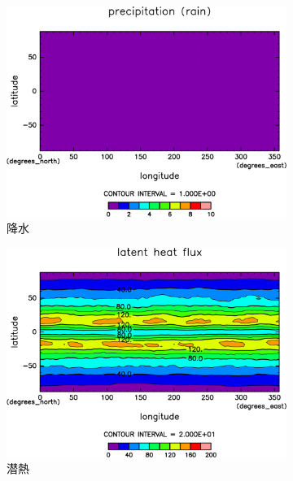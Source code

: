 \documentclass[body]{subfiles}
\begin{document}
\begin{figure}[t]
\begin{subfigure}{.4\textwidth}
		\includegraphics[width=\textwidth]{S1366/Rain,time=14600:14965-crop-rotate.pdf}
		\caption{降水\hmu*{[W/m^{-2}]}}\label{S1366降水}
	\end{subfigure}
	\begin{subfigure}{.4\textwidth}
		\centering
		\includegraphics[width=\textwidth]{S1366/Evap,time=14600:14965-crop-rotate.pdf}
		\caption{潜熱\hmu*{[W/m^{-2}]}}\label{S1366潜熱}
	\end{subfigure}
	\begin{subfigure}{.4\textwidth}
		\centering

\end{subfigure}
\end{figure}
\end{document}
